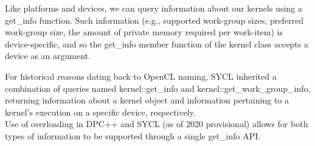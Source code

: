 Like platforms and devices, we can query information about our kernels using a get\_info function. Such information (e.g., supported work-group sizes, preferred work-group size, the amount of private memory required per work-item) is device-specific, and so the get\_info member function of the kernel class accepts a device as an argument.\par

\begin{tcolorbox}[colback=blue!5!white,colframe=blue!75!black, title=DEVICE-SPECIFIC KERNEL INFORMATION IN SYCL 1.2.1]
For historical reasons dating back to OpenCL naming, SYCL inherited a combination of queries named kernel::get\_info and kernel::get\_work\_group\_info, returning information about a kernel object and information pertaining to a kernel’s execution on a specific device, respectively.\\
Use of overloading in DPC++ and SYCL (as of 2020 provisional) allows for both types of information to be supported through a single get\_info API.
\end{tcolorbox}




































